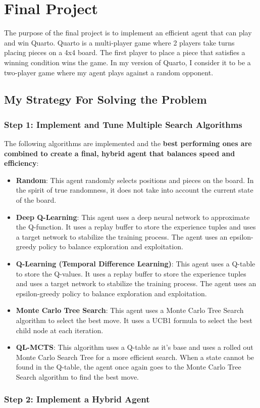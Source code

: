 
\section{Final Project}

The purpose of the final project is to implement an efficient agent that can play and win Quarto. Quarto is a multi-player game where 2 players take turns placing pieces on a 4x4 board. The first player to place a piece that satisfies a winning condition wins the game. In my version of Quarto, I consider it to be a two-player game where my agent plays against a random opponent.

\subsection{My Strategy For Solving the Problem}

\subsubsection{Step 1: Implement and Tune Multiple Search Algorithms}

The following algorithms are implemented and the \textbf{best performing ones are combined to create a final, hybrid agent that balances speed and efficiency}:

\begin{itemize}
    \item \textbf{Random}: This agent randomly selects positions and pieces on the board. In the spirit of true randomness, it does not take into account the current state of the board.
    \item \textbf{Deep Q-Learning}: This agent uses a deep neural network to approximate the Q-function. It uses a replay buffer to store the experience tuples and uses a target network to stabilize the training process. The agent uses an epsilon-greedy policy to balance exploration and exploitation.
    \item \textbf{Q-Learning (Temporal Difference Learning)}: This agent uses a Q-table to store the Q-values. It uses a replay buffer to store the experience tuples and uses a target network to stabilize the training process. The agent uses an epsilon-greedy policy to balance exploration and exploitation.
    \item \textbf{Monte Carlo Tree Search}: This agent uses a Monte Carlo Tree Search algorithm to select the best move. It uses a UCB1 formula to select the best child node at each iteration.
    \item \textbf{QL-MCTS}: This algorithm uses a Q-table as it's base and uses a rolled out Monte Carlo Search Tree for a more efficient search. When a state cannot be found in the Q-table, the agent once again goes to the Monte Carlo Tree Search algorithm to find the best move.
\end{itemize}

\subsubsection{Step 2: Implement a Hybrid Agent}

